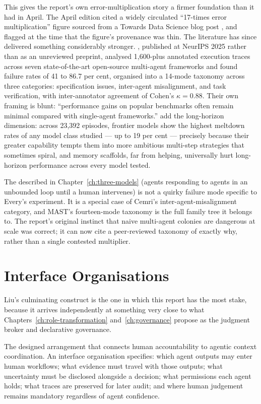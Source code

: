 This gives the report's own error-multiplication story a firmer foundation than it had in April. The April edition cited a widely circulated ``17-times error multiplication'' figure sourced from a Towards Data Science blog post \parencite{TDS2026}, and flagged at the time that the figure's provenance was thin. The literature has since delivered something considerably stronger. \textcite{Cemri2025}, published at NeurIPS 2025 rather than as an unreviewed preprint, analysed 1,600-plus annotated execution traces across seven state-of-the-art open-source multi-agent frameworks and found failure rates of 41 to 86.7 per cent, organised into a 14-mode taxonomy across three categories: specification issues, inter-agent misalignment, and task verification, with inter-annotator agreement of Cohen's $\kappa = 0.88$. Their own framing is blunt: ``performance gains on popular benchmarks often remain minimal compared with single-agent frameworks.'' \textcite{Khanal2026} add the long-horizon dimension: across 23,392 episodes, frontier models show the highest meltdown rates of any model class studied --- up to 19 per cent --- precisely because their greater capability tempts them into more ambitious multi-step strategies that sometimes spiral, and memory scaffolds, far from helping, universally hurt long-horizon performance across every model tested.

The  described in Chapter~\ref{ch:three-models} (agents responding to agents in an unbounded loop until a human intervenes) is not a quirky failure mode specific to Every's experiment. It is a special case of Cemri's inter-agent-misalignment category, and MAST's fourteen-mode taxonomy is the full family tree it belongs to. The report's original instinct that naive multi-agent colonies are dangerous at scale was correct; it can now cite a peer-reviewed taxonomy of exactly why, rather than a single contested multiplier.

\section{Interface Organisations}

Liu's culminating construct is the one in which this report has the most stake, because it arrives independently at something very close to what Chapters~\ref{ch:role-transformation} and~\ref{ch:governance} propose as the judgment broker and declarative governance.

\begin{definitionbox}[title={Interface Organisation}]
The designed arrangement that connects human accountability to agentic context coordination. An interface organisation specifies: which agent outputs may enter human workflows; what evidence must travel with those outputs; what uncertainty must be disclosed alongside a decision; what permissions each agent holds; what traces are preserved for later audit; and where human judgement remains mandatory regardless of agent confidence.
\end{definitionbox}

